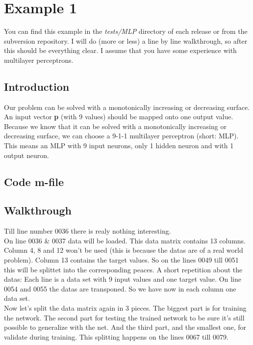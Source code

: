 \section{Example 1}
You can find this example in the \textit{tests/MLP} directory of each release or from the subversion repository. I will do (more or less) a line by line walkthrough, so after this should be everything clear. I assume that you have some experience with multilayer perceptrons.

\subsection{Introduction}
Our problem can be solved with a monotonically increasing or decreasing surface. An input vector \textbf{p} (with 9 values) should be mapped onto one output value. Because we know that it can be solved with a monotonically increasing or decreasing surface, we can choose a 9-1-1 multilayer perceptron (short: MLP).
This means an MLP with 9 input neurons, only 1 hidden neuron and with 1 output neuron.

\subsection{Code m-file}


\subsection{Walkthrough}
Till line number 0036 there is realy nothing interesting.\\
On line 0036 \& 0037 data will be loaded. This data matrix contains 13 columns. Column 4, 8 and 12 won't be used (this is because the datas are of a real world problem). Column 13 contains the target values.
So on the lines 0049 till 0051 this will be splittet into the corresponding peaces. A short repetition about the datas: Each line is a data set with 9 input values and one target value. On line 0054 and 0055 the datas are transponed. So we have now in each column one data set.\\

Now let's split the data matrix again in 3 pieces. The biggest part is for training the network. The second part for testing the trained network to be sure it's still possible to generalize with the net. And the third part, and the smallest one, for validate during training. This splitting happens on the lines 0067 till 0079.\\

